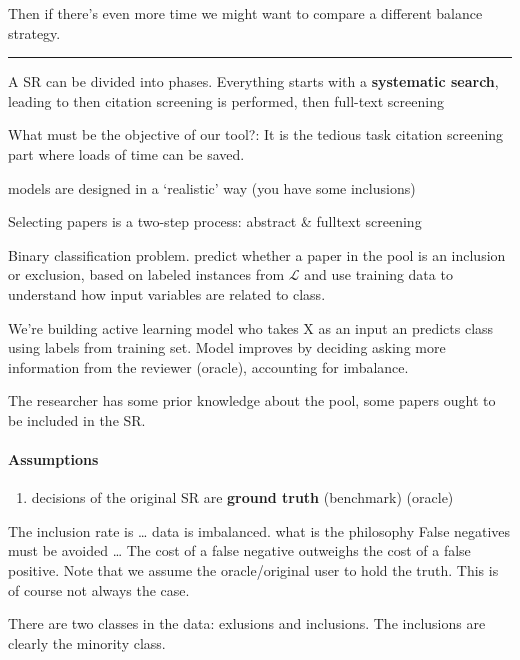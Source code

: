 \documentclass[
]{article}
\providecommand{\tightlist}{%
  \setlength{\itemsep}{0pt}\setlength{\parskip}{0pt}}
\begin{document}
Then if there's even more time we might want to compare a different
balance strategy.

\begin{center}\rule{0.5\linewidth}{0.5pt}\end{center}

A SR can be divided into phases. Everything starts with a
\textbf{systematic search}, leading to then citation screening is
performed, then full-text screening \autocite{PRISMA-PGroup2015}

What must be the objective of our tool?: It is the tedious task citation
screening part where loads of time can be saved.

models are designed in a `realistic' way (you have some inclusions)

Selecting papers is a two-step process: abstract \& fulltext screening

Binary classification problem. predict whether a paper in the pool is an
inclusion or exclusion, based on labeled instances from \(\mathcal{L}\)
and use training data to understand how input variables are related to
class.

We're building active learning model who takes X as an input an predicts
class using labels from training set. Model improves by deciding asking
more information from the reviewer (oracle), accounting for imbalance.

The researcher has some prior knowledge about the pool, some papers
ought to be included in the SR.

\hypertarget{assumptions}{%
\paragraph{Assumptions}\label{assumptions}}

\begin{enumerate}
\def\labelenumi{\arabic{enumi})}
\tightlist
\item
  decisions of the original SR are \textbf{ground truth} (benchmark)
  (oracle)
\end{enumerate}

The inclusion rate is \ldots{} data is imbalanced. what is the
philosophy False negatives must be avoided \ldots{} The cost of a false
negative outweighs the cost of a false positive. Note that we assume the
oracle/original user to hold the truth. This is of course not always the
case.

There are two classes in the data: exlusions and inclusions. The
inclusions are clearly the minority class.
\end{document}
